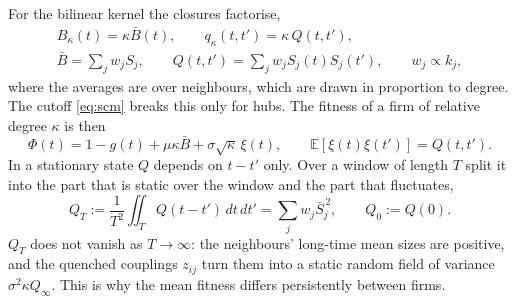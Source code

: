 \documentclass[11pt]{article}
\newcommand{\E}{\mathbb E}
\begin{document}
For the bilinear kernel the closures factorise,
\begin{gather}
  B_\kappa(t)=\kappa\bar B(t),\qquad q_\kappa(t,t')=\kappa\,Q(t,t'),\nonumber\\
  \bar B=\sum_jw_jS_j,\qquad Q(t,t')=\sum_jw_jS_j(t)S_j(t'),\qquad w_j\propto k_j ,
\end{gather}
where the averages are over neighbours, which are drawn in proportion to degree.  The cutoff
\eqref{eq:scm} breaks this only for hubs.  The fitness of a firm of relative degree $\kappa$ is
then
\begin{equation}
  \Phi(t)=1-g(t)+\mu\kappa\bar B+\sigma\sqrt\kappa\,\xi(t),\qquad\E[\xi(t)\xi(t')]=Q(t,t').
  \label{eq:fitness}
\end{equation}
In a stationary state $Q$ depends on $t-t'$ only.  Over a window of length $T$ split it into
the part that is static over the window and the part that fluctuates,
\begin{equation}
  Q_T:=\frac1{T^2}\iint_TQ(t-t')\,dt\,dt'=\sum_jw_j\bar S_j^{\,2},\qquad Q_0:=Q(0).
\end{equation}
$Q_T$ does not vanish as $T\to\infty$: the neighbours' long-time mean sizes are positive, and the
quenched couplings $z_{ij}$ turn them into a static random field of variance $\sigma^2\kappa Q_\infty$.
This is why the mean fitness differs persistently between firms.
\end{document}
